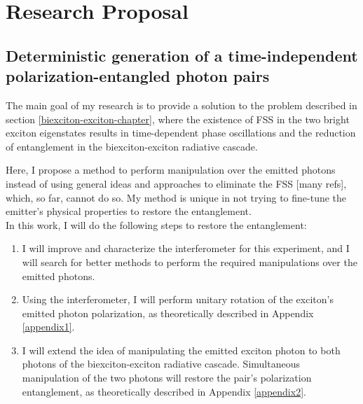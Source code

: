 \section{Research Proposal}
\subsection{Deterministic generation of a time-independent polarization-entangled photon pairs}
The main goal of my research is to provide a solution to the problem described in section \ref{biexciton-exciton-chapter}, where the existence of FSS in the two bright exciton eigenstates results in time-dependent phase oscillations and the reduction of entanglement in the biexciton-exciton radiative cascade.
\iffalse
The presence of the splitting in the lowest excitonic state is an unwanted effect in QDs that causes a degradation in the degree of entanglement between the two photons in the biexciton-exciton radiative cascade by lifting the degeneracy of the levels\cite{Winik2017}. This is due to several causes but mainly as a result of the asymmetry of the QD.$\newline$
\fi
Here, I propose a method to perform manipulation over the emitted photons instead of using general ideas and approaches to eliminate the FSS [many refs], which, so far, cannot do so. My method is unique in not trying to fine-tune the emitter's physical properties to restore the entanglement.\\
In this work, I will do the following steps to restore the entanglement:
\begin{enumerate}
	\item  I will improve and characterize the interferometer for this experiment, and I will search for better methods to perform the required manipulations over the emitted photons. 
	\item Using the interferometer, I will perform unitary rotation of the exciton's emitted photon polarization,  as theoretically described in Appendix \ref{appendix1}.
	\item I will extend the idea of manipulating the emitted exciton photon to both photons of the biexciton-exciton radiative cascade. Simultaneous manipulation of the two photons will restore the pair's polarization entanglement, as theoretically described in Appendix \ref{appendix2}.
\end{enumerate} 

